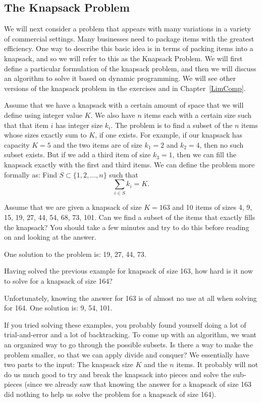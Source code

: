 \subsection{The Knapsack Problem}
\label{Knapsack}

We will next consider a problem that appears with many variations in a
variety of commercial settings.
Many businesses need to package items with the greatest efficiency.
One way to describe this basic idea is in terms of packing items into
a knapsack, and so we will refer to this as the Knapsack Problem.
We will first define a particular formulation of the knapsack problem,
and then we will discuss an algorithm to solve it based on dynamic
programming.
We will see other versions of the knapsack problem in the exercises
and in Chapter~\ref{LimComp}.

Assume that we have a knapsack with a certain amount of space that we
will define using integer value $K$.
We also have $n$ items each with a certain size such that
that item $i$ has integer size $k_i$.
The problem is to find a subset of the $n$ items whose sizes exactly
sum to $K$, if one exists.
For example, if our knapsack has capacity $K = 5$ and the two items
are of size $k_1 = 2$ and $k_2 = 4$, then no such subset exists.
But if we add a third item of size $k_3 = 1$,
then we can fill the knapsack exactly with the first and third items.
We can define the problem more formally as:
Find $S \subset \{1, 2, ..., n\}$ such that
\[\sum_{i \in S} k_i = K.\]

\begin{example}
Assume that we are given a knapsack of size $K = 163$ and 
10 items of sizes 4, 9, 15, 19, 27, 44, 54, 68, 73, 101.
Can we find a subset of the items that exactly fills the knapsack?
You should take a few minutes and try to do this before reading on and
looking at the answer.

One solution to the problem is: 19, 27, 44, 73.
\end{example}

\begin{example}
Having solved the previous example for knapsack of size 163, how hard
is it now to solve for a knapsack of size 164?

Unfortunately, knowing the answer for 163 is of almost no use at all
when solving for 164.
One solution is: 9, 54, 101.
\end{example}

If you tried solving these examples, you probably found yourself doing
a lot of trial-and-error and a lot of backtracking.
To come up with an algorithm, we want an organized way to go through
the possible subsets.
Is there a way to make the problem smaller, so that we can apply
divide and conquer?
We essentially have two parts to the input: The knapsack size $K$ and
the $n$ items.
It probably will not do us much good to try and break the knapsack
into pieces and solve the sub-pieces (since we already saw that
knowing the answer for a knapsack of size 163 did nothing to help us
solve the problem for a knapsack of size 164).

